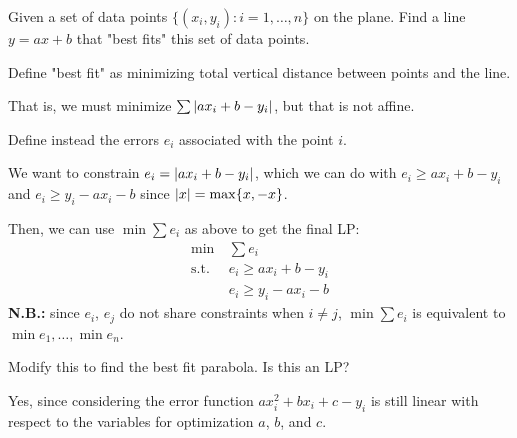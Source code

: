 \documentclass[class=co250,tikz,notes]{agony}
\begin{document}
\begin{example}
  Given a set of data points $\{(x_i, y_i) : i = 1,\dotsc,n\}$ on the plane. Find a line $y = ax + b$ that "best fits" this set of data points.
\end{example}
\begin{sol}
  Define "best fit" as minimizing total vertical distance between points and the line.

  That is, we must minimize $\sum \abs{ax_i + b - y_i}$, but that is not affine.

  Define instead the errors $e_i$ associated with the point $i$.

  We want to constrain $e_i = \abs{ax_i + b - y_i}$, which we can do with $e_i \geq ax_i + b - y_i$ and $e_i \geq y_i - ax_i - b$ since $\abs{x} = \max\{x, -x\}$.

  Then, we can use $\min \sum e_i$ as above to get the final LP:
  \begin{align*}
    \min \        & \sum e_i                \\
    \text{s.t.}\  & e_i \geq ax_i + b - y_i \\
                  & e_i \geq y_i - ax_i - b
  \end{align*}
  \textbf{N.B.:} since $e_i$, $e_j$ do not share constraints when $i \neq j$, $\min \sum e_i$ is equivalent to $\min e_1, \dotsc, \min e_n$.
\end{sol}

\begin{xca}
  Modify this to find the best fit parabola. Is this an LP?
\end{xca}
\begin{sol}
  Yes, since considering the error function $ax_i^2 + bx_i + c - y_i$ is still linear with respect to the variables for optimization $a$, $b$, and $c$.
\end{sol}
\end{document}
